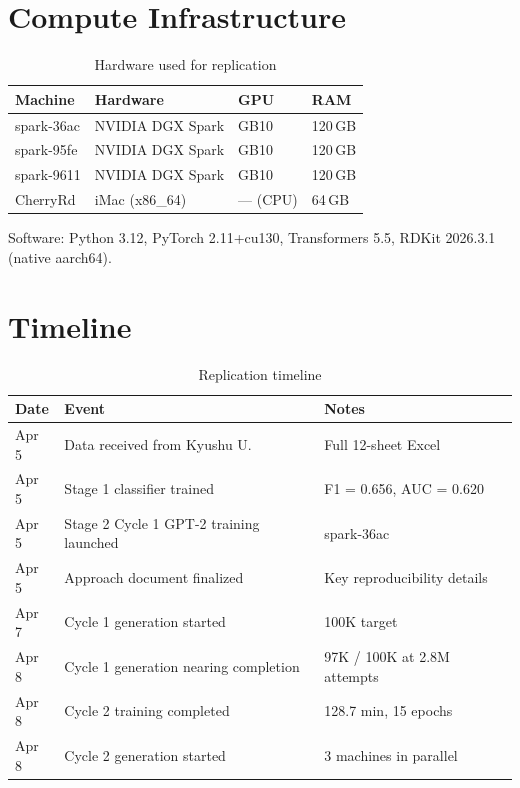 \documentclass[11pt]{article}
\begin{document}
\section{Compute Infrastructure}

\begin{table}[H]
\centering
\caption{Hardware used for replication}
\label{tab:hardware}
\small
\begin{tabular}{@{}llll@{}}
\toprule
\textbf{Machine} & \textbf{Hardware} & \textbf{GPU} & \textbf{RAM} \\
\midrule
spark-36ac & NVIDIA DGX Spark & GB10 & 120\,GB \\
spark-95fe & NVIDIA DGX Spark & GB10 & 120\,GB \\
spark-9611 & NVIDIA DGX Spark & GB10 & 120\,GB \\
CherryRd & iMac (x86\_64) & --- (CPU) & 64\,GB \\
\bottomrule
\end{tabular}
\end{table}

\noindent Software: Python 3.12, PyTorch 2.11+cu130, Transformers 5.5, RDKit 2026.3.1 (native aarch64).

\section{Timeline}

\begin{table}[H]
\centering
\caption{Replication timeline}
\label{tab:timeline}
\small
\begin{tabular}{@{}lll@{}}
\toprule
\textbf{Date} & \textbf{Event} & \textbf{Notes} \\
\midrule
Apr 5 & Data received from Kyushu U. & Full 12-sheet Excel \\
Apr 5 & Stage 1 classifier trained & F1 = 0.656, AUC = 0.620 \\
Apr 5 & Stage 2 Cycle 1 GPT-2 training launched & spark-36ac \\
Apr 5 & Approach document finalized & Key reproducibility details \\
Apr 7 & Cycle 1 generation started & 100K target \\
Apr 8 & Cycle 1 generation nearing completion & 97K / 100K at 2.8M attempts \\
Apr 8 & Cycle 2 training completed & 128.7 min, 15 epochs \\
Apr 8 & Cycle 2 generation started & 3 machines in parallel \\
\bottomrule
\end{tabular}
\end{table}
\end{document}
